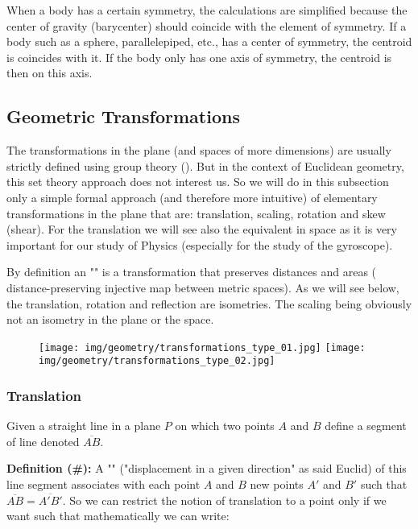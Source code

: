 	\begin{tcolorbox}[title=Remark,colframe=black,arc=10pt]
	When a body has a certain symmetry, the calculations are simplified because the center of gravity (barycenter) should coincide with the element of symmetry. If a body such as a sphere, parallelepiped, etc., has a center of symmetry, the centroid is coincides with it. If the body only has one axis of symmetry, the centroid is then on this axis.
	\end{tcolorbox}
	
	\subsection{Geometric Transformations}
	The transformations in the plane (and spaces of more dimensions) are usually strictly defined using group theory (). But in the context of Euclidean geometry, this set theory approach does not interest us. So we will do in this subsection only a simple formal approach (and therefore more intuitive) of elementary transformations in the plane that are: translation, scaling, rotation and skew (shear). For the translation we will see also the equivalent in space as it is very important for our study of Physics (especially for the study of the gyroscope).
	\begin{tcolorbox}[title=Remark,colframe=black,arc=10pt]
	By definition an "" is a transformation that preserves distances and areas ( distance-preserving injective map between metric spaces). As we will see below, the translation, rotation and reflection are isometries. The scaling being obviously not an isometry in the plane or the space.
	\end{tcolorbox}
	\begin{figure}[H]
		\centering
		\texttt{[image: img/geometry/transformations\_type\_01.jpg]}
		\texttt{[image: img/geometry/transformations\_type\_02.jpg]}
	\end{figure}
	
	\pagebreak
	\subsubsection{Translation}
	Given a straight line in a plane $P$ on which two points $A$ and $B$ define a segment of line denoted $\overline{AB}$.

	\textbf{Definition (\#\mydef):} A "" ("displacement in a given direction" as said Euclid) of this line segment associates with each point $A$ and $B$ new points $A'$ and $B'$ such that $\overline{AB}=\overline{A'B'}$. So we can restrict the notion of translation to a point only if we want such that mathematically we can write:
	
